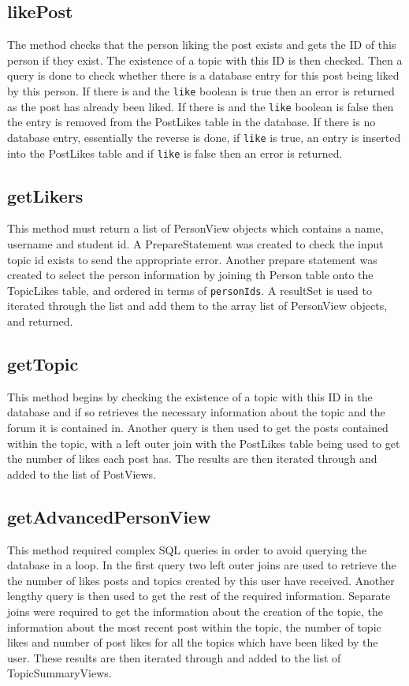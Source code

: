 \documentclass{article}
\begin{document}
\subsection*{likePost}

The method checks that the person liking the post exists and gets the ID of this person if they exist. The existence of a topic with this ID is then checked. Then a query is done to check whether there is a database entry for this post being liked by this person. If there is and the \texttt{like} boolean is true then an error is returned as the post has already been liked. If there is and the \texttt{like} boolean is false then the entry is removed from the PostLikes table in the database. If there is no database entry, essentially the reverse is done, if \texttt{like} is true, an entry is inserted into the PostLikes table and if \texttt{like} is false then an error is returned.

\subsection*{getLikers}

This method must return a list of PersonView objects which contains a name, username and student id. A PrepareStatement was created to check the input topic id exists to send the appropriate error. Another prepare statement was created to select the person information by joining th Person table onto the TopicLikes table, and ordered in terms of \texttt{personIds}. A resultSet is used to iterated through the list and add them to the array list of PersonView objects, and returned.

\subsection*{getTopic}

This method begins by checking the existence of a topic with this ID in the database and if so retrieves the necessary information about the topic and the forum it is contained in. Another query is then used to get the posts contained within the topic, with a left outer join with the PostLikes table being used to get the number of likes each post has. The results are then iterated through and added to the list of PostViews.

\subsection*{getAdvancedPersonView}

This method required complex SQL queries in order to avoid querying the database in a loop. In the first query two left outer joins are used to retrieve the the number of likes posts and topics created by this user have received. Another lengthy query is then used to get the rest of the required information. Separate joins were required to get the information about the creation of the topic, the information about the most recent post within the topic, the number of topic likes and number of post likes for all the topics which have been liked by the user. These results are then iterated through and added to the list of TopicSummaryViews.
\end{document}
